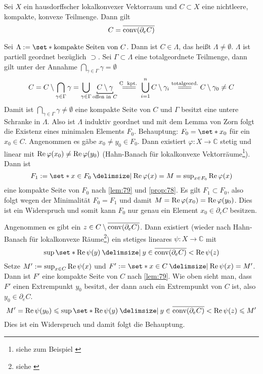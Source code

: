 \begin{satz}[{name={{Krein-Milman}}},label=satz:krein_milman]
	Sei $X$ ein hausdorffscher lokalkonvexer Vektorraum und $C \subset X$ eine nichtleere, kompakte, konvexe Teilmenge.
	Dann gilt 
	\[
		C=\overline{\operatorname{conv}(\partial_e C)}
	\]
\end{satz}
\begin{beweis}
	Sei $\Lambda := \set*{\text{kompakte Seiten von }C}$.
	Dann ist $C \in \Lambda$, das heißt $\Lambda \neq \emptyset$.
	$\Lambda$ ist partiell geordnet bezüglich $\supset$.
	Sei $\Gamma \subset \Lambda$ eine totalgeordnete Teilmenge, dann gilt unter der Annahme $\bigcap_{\gamma \in \Gamma} \gamma =\emptyset$
	\[
		C= C \setminus \bigcap_{\gamma \in \Gamma} \gamma = \bigcup_{\gamma \in \Gamma} \Underbracket{C \setminus \gamma}{\text{offen in }C}\StackText{C \text{ kpt.} }{=\joinrel=\joinrel=} 
		\bigcup_{i=1}^n C \setminus \gamma_i \StackText{totalgeord.}{=\joinrel=\joinrel=} C \setminus \gamma_0 \neq C
	\]
	Damit ist $\bigcap_{\gamma \in \Gamma} \gamma \neq \emptyset$ eine kompakte Seite von $C$ und $\Gamma$ besitzt eine untere Schranke in $\Lambda$.
	Also ist $\Lambda$ induktiv geordnet und mit dem Lemma von Zorn folgt die Existenz eines minimalen Elements $F_0$.
	Behauptung: $F_0= \set*{x_0}$ für ein $x_0 \in C$.
	Angenommen es gäbe $x_0 \neq y_0 \in F_0$. 
	Dann existiert $\varphi \colon X \to \mathbb{C}$ stetig und linear mit $\operatorname{Re} \varphi(x_0) \neq \operatorname{Re} \varphi(y_0)$ (Hahn-Banach für lokalkonvexe Vektorräume\footnote{siehe zum Beispiel \cite[Cor. A.9, S. 271]{Murphy}}).
	Dann ist 
	\[
		F_1 :=  \set*{x \in F_0 \given \re \varphi(x)=M=\sup\nolimits_{x \in F_0} \re \varphi(x)}
	\]
	eine kompakte Seite von $F_0$ nach \autoref{lem:79} und \autoref{prop:78}.
	Es gilt $F_1 \subset F_0$, also folgt wegen der Minimalität $F_0=F_1$ und damit $M= \operatorname{Re} \varphi(x_0) = \operatorname{Re} \varphi(y_0)$.
	Dies ist ein Widerspruch und somit kann $F_0$ nur genau ein Element $x_0 \in \partial_e C$ besitzen.
	
	Angenommen es gibt ein $z \in C \setminus \overline{\operatorname{conv}(\partial_e C)}$.
	Dann existiert (wieder nach Hahn-Banach für lokalkonvexe Räume\footnote{siehe \cite[Th. A.7, S. 270]{Murphy}}) ein stetiges lineares $\psi \colon X \to \mathbb{C}$ mit 
	\[
		\sup\set*{\re \psi(y) \given y \in \overline{\conv(\partial_e C)}} < \re \psi(z)
	\]
	Setze $M' := \sup_{x \in C} \operatorname{Re} \psi(x)$ und $F':= \set*{x \in C \given \re \psi(x) =M'}$.
	Dann ist $F'$ eine kompakte Seite von $C$ nach \autoref{lem:79}.
	Wie oben sieht man, dass $F'$ einen Extrempunkt $y_0$ besitzt, der dann auch ein Extrempunkt von $C$ ist, also $y_0 \in \partial_e C$.
	\[
		M' = \re \psi(y_0) \le \sup \set*{\re \psi(y) \given y \in \overline{\conv(\partial_e C)}} < \re \psi(z) \le M'
	\]
	Dies ist ein Widerspruch und damit folgt die Behauptung.
\end{beweis}

